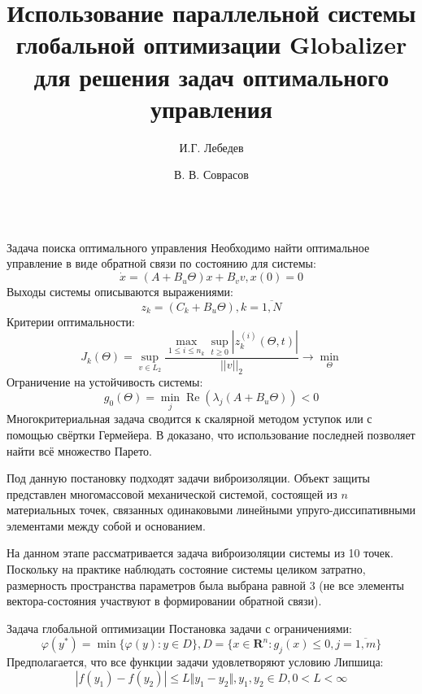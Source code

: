 \documentclass{beamer}
\title{Использование параллельной системы глобальной оптимизации Globalizer для
решения задач оптимального управления}
\author{И.Г. Лебедев \and В. В. Соврасов}
\institute{ННГУ им. Н.И. Лобачевского}
\DeclareMathOperator{\re}{\operatorname{Re}}
\begin{document}
\begin{frame}[t]
    \begin{columns}[t]
        \begin{column}[t]{0.48\paperwidth}
            \begin{block}{Задача поиска оптимального управления}
              Необходимо найти оптимальное управление в виде обратной связи по состоянию для системы:
              \begin{displaymath}
                \dot x = (A+B_u\Theta)x + B_v v, x(0)=0
              \end{displaymath}
              Выходы системы описываются выражениями:
              \begin{displaymath}
                z_k=(C_k+B_u\Theta),k=\overline{1,N}
              \end{displaymath}
              Критерии оптимальности:
              \begin{displaymath}
                J_k(\Theta)=\sup_{v\in L_2} \frac{\max_{1\leqslant i \leqslant n_k} \sup_{t\geqslant 0}|z_k^{(i)}(\Theta,t)|}{||v||_2} \rightarrow\min_{\Theta}
              \end{displaymath}
            Ограничение на устойчивость системы:
            \begin{displaymath}
              g_0(\Theta)=\min_{j}\re(\lambda_j(A+B_u\Theta)) < 0
            \end{displaymath}
            Многокритериальная задача сводится к скалярной методом уступок или с помощью свёртки Гермейера.
            В \cite{optControl} доказано, что использование последней позволяет найти всё множество Парето.

            Под данную постановку подходят задачи виброизоляции. Объект защиты представлен многомассовой механической системой, состоящей из
            \(n\) материальных точек, связанных одинаковыми линейными упруго-диссипативными элементами между собой и основанием.

            На данном этапе рассматривается задача виброизоляции системы из 10 точек. Поскольку на практике наблюдать состояние системы целиком
            затратно, размерность пространства параметров была выбрана равной 3 (не все элементы вектора-состояния участвуют в формировании обратной связи).
          \end{block}
            \begin{block}{Задача глобальной оптимизации}
              Постановка задачи с ограничениями:
              \begin{displaymath}
                \varphi(y^*)=\min\{\varphi(y):y\in D\}, D=\{x\in \mathbf{R}^n: g_j(x) \leqslant 0, j=\overline{1,m}\}
              \end{displaymath}
              Предполагается, что все функции задачи удовлетворяют условию Липшица:
              \begin{displaymath}
              |f(y_1)-f(y_2)|\leqslant L\Vert y_1-y_2\Vert,y_1,y_2\in D,0<L<\infty
              \end{displaymath}


\end{block}
\end{column}
\end{columns}
\end{frame}
\end{document}
